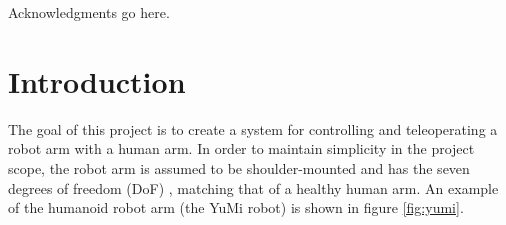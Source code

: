 \uomtoc


\begin{abstract} %
  Abstract goes here.
\end{abstract}%
\clearpage



\begin{uomoriginality}
  \uomoriginalitydeclaration 
\end{uomoriginality}
\uomcopyrightstatement



\begin{uomacknowledgements}
Acknowledgments go here.
\end{uomacknowledgements}



\uomstartmainbody %



\section{Introduction} %
  
  The goal of this project is to create a system for controlling and teleoperating a robot arm with a human arm. 
  In order to maintain simplicity in the project scope, the robot arm is assumed to be shoulder-mounted and has the seven degrees of freedom (DoF) \cite{ref:arm_dofs}, matching that of a healthy human arm.
  An example of the humanoid robot arm (the YuMi robot) is shown in figure \ref{fig:yumi}.

